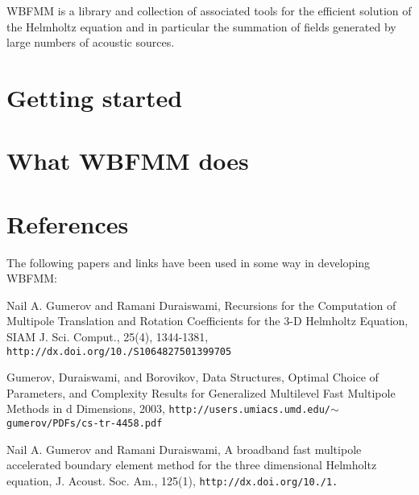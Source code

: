 W\+B\+F\+MM is a library and collection of associated tools for the efficient solution of the Helmholtz equation and in particular the summation of fields generated by large numbers of acoustic sources.\section{Getting started}\label{index_start}
\section{What W\+B\+F\+M\+M does}\label{index_what}
\section{References}\label{index_references}
The following papers and links have been used in some way in developing W\+B\+F\+MM\+:


\begin{DoxyEnumerate}
\item Nail A. Gumerov and Ramani Duraiswami, Recursions for the Computation of Multipole Translation and Rotation Coefficients for the 3-\/D Helmholtz Equation, S\+I\+AM J. Sci. Comput., 25(4), 1344-\/1381, {\tt http\+://dx.\+doi.\+org/10./\+S1064827501399705}
\item Gumerov, Duraiswami, and Borovikov, Data Structures, Optimal Choice of Parameters, and Complexity Results for Generalized Multilevel Fast Multipole Methods in d Dimensions, 2003, {\tt http\+://users.\+umiacs.\+umd.\+edu/$\sim$gumerov/\+P\+D\+Fs/cs-\/tr-\/4458.\+pdf}
\item Nail A. Gumerov and Ramani Duraiswami, A broadband fast multipole accelerated boundary element method for the three dimensional Helmholtz equation, J. Acoust. Soc. Am., 125(1), {\tt http\+://dx.\+doi.\+org/10./1.} 
\end{DoxyEnumerate}